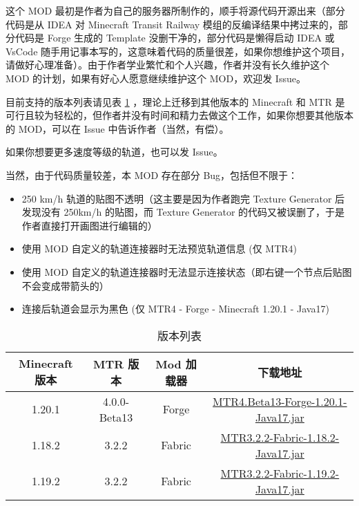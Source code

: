 \documentclass{article}
\begin{document}
这个 MOD 最初是作者为自己的服务器所制作的，顺手将源代码开源出来（部分代码是从 IDEA 对 Minecraft Transit Railway 模组的反编译结果中拷过来的，部分代码是 Forge 生成的 Template 没删干净的，部分代码是懒得启动 IDEA 或 VsCode 随手用记事本写的，这意味着代码的质量很差，如果你想维护这个项目，请做好心理准备）。由于作者学业繁忙和个人兴趣，作者并没有长久维护这个 MOD 的计划，如果有好心人愿意继续维护这个 MOD，欢迎发 Issue。

目前支持的版本列表请见表 \ref{versionTable} ，理论上迁移到其他版本的 Minecraft 和 MTR 是可行且较为轻松的，但作者并没有时间和精力去做这个工作，如果你想要其他版本的 MOD，可以在 Issue 中告诉作者（当然，有偿）。

如果你想要更多速度等级的轨道，也可以发 Issue。

当然，由于代码质量较差，本 MOD 存在部分 Bug，包括但不限于：

\begin{itemize}
    \item 250 km/h 轨道的贴图不透明（这主要是因为作者跑完 Texture Generator 后发现没有 250km/h 的贴图，而 Texture Generator 的代码又被误删了，于是作者直接打开画图进行编辑的）
    \item 使用 MOD 自定义的轨道连接器时无法预览轨道信息 (仅 MTR4)
    \item 使用 MOD 自定义的轨道连接器时无法显示连接状态（即右键一个节点后贴图不会变成带箭头的）
    \item 连接后轨道会显示为黑色 (仅 MTR4 - Forge - Minecraft 1.20.1 - Java17)
\end{itemize}

\begin{table}[!ht]
    \centering
    \label{versionTable}
    \begin{tabular}{c|c|c|c}
        \textbf{Minecraft 版本} & \textbf{MTR 版本} & \textbf{Mod 加载器} & \textbf{下载地址} \\ \hline
        1.20.1 & 4.0.0-Beta13 & Forge & \href{https://github.com/lihugang/mtr-cr-speed-rails/releases/download/MTR4/MTR4.Beta13-Forge-1.20.1-Java17.jar}{MTR4.Beta13-Forge-1.20.1-Java17.jar} \\ 
        1.18.2 & 3.2.2 & Fabric & \href{https://github.com/lihugang/mtr-cr-speed-rails/releases/download/MTR3.2.2/MTR3.2.2-Fabric-1.18.2-Java17.jar}{MTR3.2.2-Fabric-1.18.2-Java17.jar} \\ 
        1.19.2 & 3.2.2 & Fabric & \href{https://github.com/lihugang/mtr-cr-speed-rails/releases/download/MTR3.2.2/MTR3.2.2-Fabric-1.19.2-Java17.jar}{MTR3.2.2-Fabric-1.19.2-Java17.jar} \\ 
    \end{tabular}
    \caption{版本列表}
\end{table}
\end{document}

